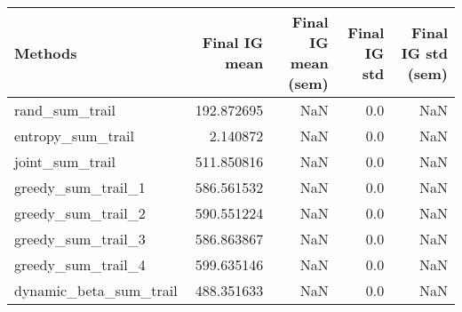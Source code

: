 \begin{tabular}{lrrrr}
\toprule
                Methods &  Final IG mean &  Final IG mean (sem) &  Final IG std &  Final IG std (sem) \\
\midrule
         rand\_sum\_trail &     192.872695 &                  NaN &           0.0 &                 NaN \\
      entropy\_sum\_trail &       2.140872 &                  NaN &           0.0 &                 NaN \\
        joint\_sum\_trail &     511.850816 &                  NaN &           0.0 &                 NaN \\
     greedy\_sum\_trail\_1 &     586.561532 &                  NaN &           0.0 &                 NaN \\
     greedy\_sum\_trail\_2 &     590.551224 &                  NaN &           0.0 &                 NaN \\
     greedy\_sum\_trail\_3 &     586.863867 &                  NaN &           0.0 &                 NaN \\
     greedy\_sum\_trail\_4 &     599.635146 &                  NaN &           0.0 &                 NaN \\
 dynamic\_beta\_sum\_trail &     488.351633 &                  NaN &           0.0 &                 NaN \\
\bottomrule
\end{tabular}

